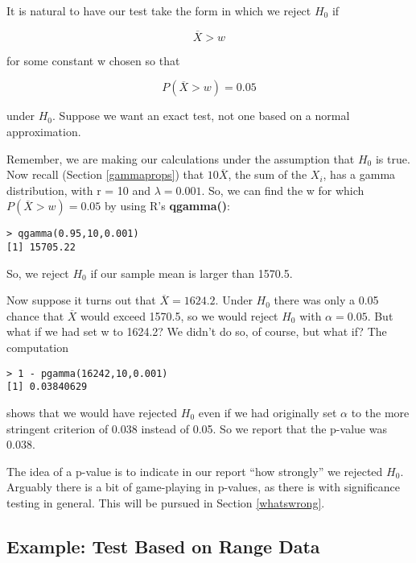 It is natural to have our test take the form in which we reject
$H_0$ if 

\begin{equation}
\overline{X} > w
\end{equation}

for some constant w chosen so that

\begin{equation}
\label{exactbulb}
P(\overline{X} > w) = 0.05
\end{equation}

under $H_0$.  Suppose we want an exact test, not one based on a normal
approximation. 

Remember, we are making our calculations under the assumption that $H_0$
is true.  Now recall (Section \ref{gammaprops}) that $10 \overline{X}$,
the sum of the $X_i$, has a gamma distribution, with r = 10 and $\lambda
= 0.001$.  So, we can find the w for which $P(\overline{X} > w) = 0.05$
by using R's {\bf qgamma()}:

\begin{Verbatim}[fontsize=\relsize{-2}]
> qgamma(0.95,10,0.001)
[1] 15705.22
\end{Verbatim}

So, we reject $H_0$ if our sample mean is larger than 1570.5.

Now suppose it turns out that $\overline{X} = 1624.2$.  Under $H_0$
there was only a 0.05 chance that $\overline{X}$ would exceed 1570.5, so
we would reject $H_0$ with $\alpha = 0.05$.  But what if we had set w to
1624.2?  We didn't do so, of course, but what if?  The computation 

\begin{lstlisting}
> 1 - pgamma(16242,10,0.001)
[1] 0.03840629
\end{lstlisting}

shows that we would have rejected $H_0$ even if we had originally set
$\alpha$ to the more stringent criterion of 0.038 instead of 0.05.  So
we report that the p-value was 0.038.

The idea of a p-value is to indicate in our report ``how strongly'' we
rejected $H_0$.  Arguably there is a bit of game-playing in p-values, as
there is with significance testing in general.  This will be pursued in
Section \ref{whatswrong}.

\subsection{Example:  Test Based on Range Data}

